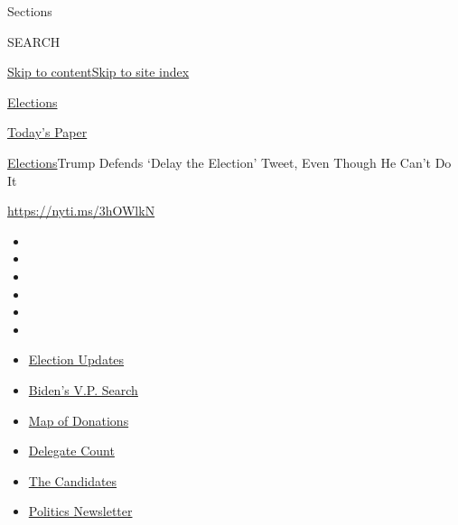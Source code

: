 Sections

SEARCH

\protect\hyperlink{site-content}{Skip to
content}\protect\hyperlink{site-index}{Skip to site index}

\href{https://www.nytimes3xbfgragh.onion/news-event/2020-election}{Elections}

\href{https://myaccount.nytimes3xbfgragh.onion/auth/login?response_type=cookie\&client_id=vi}{}

\href{https://www.nytimes3xbfgragh.onion/section/todayspaper}{Today's
Paper}

\href{/news-event/2020-election}{Elections}\textbar{}Trump Defends
`Delay the Election' Tweet, Even Though He Can't Do It

\url{https://nyti.ms/3hOWlkN}

\begin{itemize}
\item
\item
\item
\item
\item
\item
\end{itemize}

\begin{itemize}
\item
  \href{https://www.nytimes3xbfgragh.onion/2020/07/31/us/elections/biden-vs-trump.html?action=click\&pgtype=Article\&state=default\&region=TOP_BANNER\&context=storylines_menu}{Election
  Updates}
\item
  \href{https://www.nytimes3xbfgragh.onion/article/biden-vice-president-2020.html?action=click\&pgtype=Article\&state=default\&region=TOP_BANNER\&context=storylines_menu}{Biden's
  V.P. Search}
\item
  \href{https://www.nytimes3xbfgragh.onion/interactive/2020/07/24/us/politics/trump-biden-campaign-donors.html?action=click\&pgtype=Article\&state=default\&region=TOP_BANNER\&context=storylines_menu}{Map
  of Donations}
\item
  \href{https://www.nytimes3xbfgragh.onion/interactive/2020/us/elections/delegate-count-primary-results.html?action=click\&pgtype=Article\&state=default\&region=TOP_BANNER\&context=storylines_menu}{Delegate
  Count}
\item
  \href{https://www.nytimes3xbfgragh.onion/interactive/2019/us/politics/2020-presidential-candidates.html?action=click\&pgtype=Article\&state=default\&region=TOP_BANNER\&context=storylines_menu}{The
  Candidates}
\item
  \href{https://www.nytimes3xbfgragh.onion/newsletters/politics?action=click\&pgtype=Article\&state=default\&region=TOP_BANNER\&context=storylines_menu}{Politics
  Newsletter}
\end{itemize}

